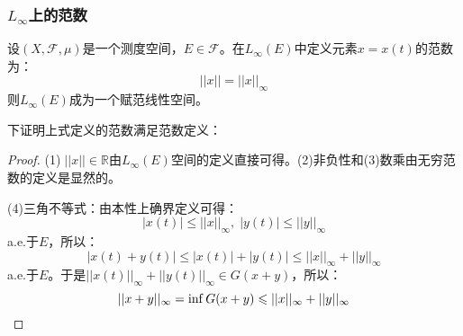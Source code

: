 \subsubsection{$L_{\infty}$上的范数}
\begin{definition}
	设$(X,\mathscr{F},\mu)$是一个测度空间，$E\in\mathscr{F}$。在$L_{\infty}(E)$中定义元素$x=x(t)$的范数为：
	\begin{equation*}
		||x||=||x||_\infty
	\end{equation*}
	则$L_{\infty}(E)$成为一个赋范线性空间。
\end{definition}
下证明上式定义的范数满足范数定义：
\begin{proof}
	(1)$\;||x||\in\mathbb{R}$由$L_{\infty}(E)$空间的定义直接可得。(2)非负性和(3)数乘由无穷范数的定义是显然的。\par
	(4)三角不等式：由本性上确界定义可得：
	\begin{equation*}
		|x(t)|\leqslant||x||_\infty,\;|y(t)|\leqslant||y||_\infty
	\end{equation*}
	a.e.于$E$，所以：
	\begin{equation*}
		|x(t)+y(t)|\leqslant|x(t)|+|y(t)|\leqslant||x||_\infty+||y||_\infty
	\end{equation*}
	a.e.于$E$。于是$||x(t)||_\infty+||y(t)||_\infty\in G(x+y)$，所以：
	\begin{equation*}
		||x+y||_\infty=\inf G(x+y)\leqslant||x||_\infty+||y||_\infty\qedhere
	\end{equation*}
\end{proof}

